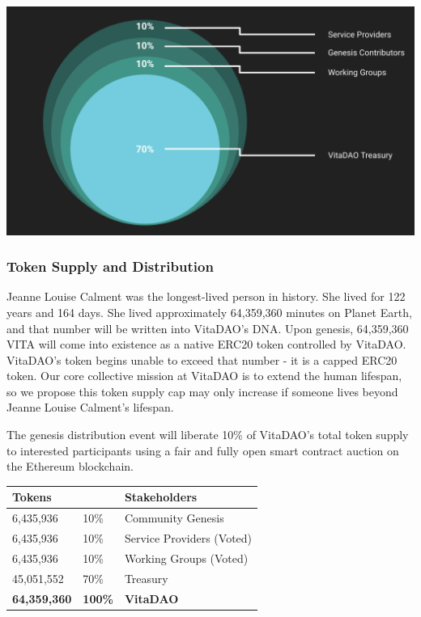 \documentclass[10pt,letterpaper]{article}
\begin{document}
\vspace{15pt}
\begin{center}
\includegraphics[width=\linewidth]{images/Initial Token Allocation.png} 
\end{center}

\subsubsection{Token Supply and Distribution}
Jeanne Louise Calment was the longest-lived person in history. She lived for 122 years and 164 days. She lived approximately 64,359,360 minutes on Planet Earth, and that number will be written into  VitaDAO’s DNA. Upon genesis, 64,359,360 VITA will come into existence as a native ERC20 token controlled by VitaDAO. VitaDAO’s token begins unable to exceed that number - it is a capped ERC20 token. Our core collective mission at VitaDAO is to extend the human lifespan, so we propose this token supply cap may only increase if someone lives beyond Jeanne Louise Calment's lifespan.

The genesis distribution event will liberate 10\% of VitaDAO's total token supply to interested participants using a fair and fully open smart contract auction on the Ethereum blockchain.

\begin{table}[h!]
  \begin{center}
    \setlength{\extrarowheight}{5pt}
	\begin{tabular}{p{}p{}p{}}
		\textbf{Tokens} & & \textbf{Stakeholder}s \\ 
		\hline
		6,435,936 & 10\% & Community Genesis \\ 
		6,435,936 & 10\% & Service Providers (Voted) \\ 
		6,435,936 & 10\% & Working Groups (Voted) \\ 
		45,051,552 & 70\% & Treasury \\ 
		\hline 
		\textbf{64,359,360} & \textbf{100\%} & \textbf{VitaDAO} \\ 
		\hline 
	\end{tabular} 
  \end{center}
\end{table}
\end{document}
